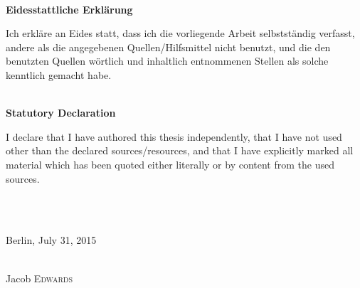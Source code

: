 \documentclass[%
   a4paper,%
  11pt,                    %
  openright,              %
  headsepline,          %
  cleardoubleempty,
  chapterprefix,
  titlepage,%
  liststotoc,%
  bibtotoc,%
  idxtotoc,%
  headinclude,           %
  pointlessnumbers,%
  USenglish
  ]{scrbook}
\renewcommand{\pdfbookmark}[3][]{}
\theoremstyle{break}
\begin{document}

\ \\ 
 
\vspace{1.0cm}
 
\textbf{Eidesstattliche Erkl\"arung}
 
Ich erkl\"are an Eides statt, dass ich die vorliegende Arbeit selbstst\"andig 
verfasst, andere als die angegebenen Quellen/Hilfsmittel nicht benutzt, 
und die den benutzten Quellen w\"ortlich und inhaltlich entnommenen Stellen 
als solche kenntlich gemacht habe.
 
\ \\
 
\textbf{Statutory Declaration}
 
I declare that I have authored this thesis independently, that I have not used 
other than the declared sources/resources, and that I have explicitly marked 
all material which has been quoted either literally or by content from the used sources.
 
\ \\ \ \\
 
\begin{flushright} 
 
Berlin, July 31, 2015
 
\ \\
 
Jacob \textsc{Edwards}
 
\end{flushright}
 
\newpage



\thispagestyle{empty}
\pdfbookmark{Abstract}{abstract}

\newpage

\thispagestyle{empty}
\pdfbookmark{Acknowledgements}{conform}

\newpage



\end{document}
